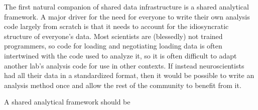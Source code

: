 \documentclass[10pt]{article}
\begin{document}
\begin{multicols}{2}
The first natural companion of shared data infrastructure is a shared
analytical framework. A major driver for the need for everyone to write
their own analysis code largely from scratch is that it needs to account
for the idiosyncratic structure of everyone's data. Most scientists are
(blessedly) not trained programmers, so code for loading and negotiating
loading data is often intertwined with the code used to analyze it, so
it is often difficult to adapt another lab's analysis code for use in
other contexts. If instead neuroscientists had all their data in a
standardized format, then it would be possible to write an analysis
method once and allow the rest of the community to benefit from it.

A shared analytical framework should be

\begin{itemize}


\end{itemize}
\end{multicols}
\end{document}
